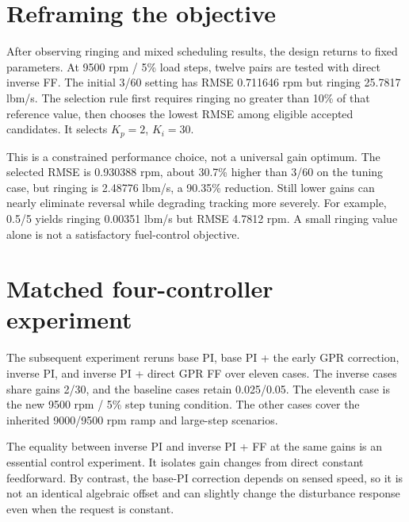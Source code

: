 \section{Reframing the objective}
After observing ringing and mixed scheduling results, the design returns to fixed parameters. At 9500 rpm / 5\% load steps, twelve pairs are tested with direct inverse FF. The initial 3/60 setting has RMSE 0.711646 rpm but ringing 25.7817 lbm/s. The selection rule first requires ringing no greater than 10\% of that reference value, then chooses the lowest RMSE among eligible accepted candidates. It selects $K_p=2$, $K_i=30$.

This is a constrained performance choice, not a universal gain optimum. The selected RMSE is 0.930388 rpm, about 30.7\% higher than 3/60 on the tuning case, but ringing is 2.48776 lbm/s, a 90.35\% reduction. Still lower gains can nearly eliminate reversal while degrading tracking more severely. For example, 0.5/5 yields ringing 0.00351 lbm/s but RMSE 4.7812 rpm. A small ringing value alone is not a satisfactory fuel-control objective.



\section{Matched four-controller experiment}
The subsequent experiment reruns base PI, base PI + the early GPR correction, inverse PI, and inverse PI + direct GPR FF over eleven cases. The inverse cases share gains 2/30, and the baseline cases retain 0.025/0.05. The eleventh case is the new 9500 rpm / 5\% step tuning condition. The other cases cover the inherited 9000/9500 rpm ramp and large-step scenarios.


The equality between inverse PI and inverse PI + FF at the same gains is an essential control experiment. It isolates gain changes from direct constant feedforward. By contrast, the base-PI correction depends on sensed speed, so it is not an identical algebraic offset and can slightly change the disturbance response even when the request is constant.


